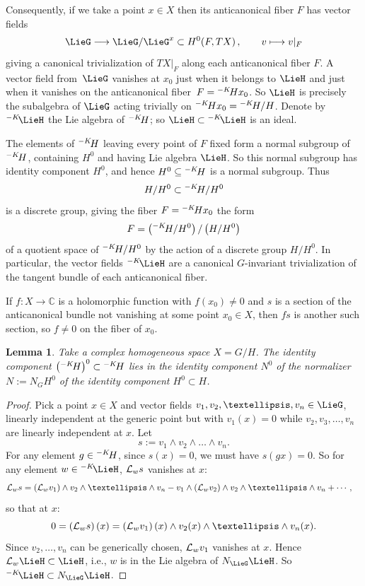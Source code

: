 \documentclass[11pt]{article}
\numberwithin{equation}{section}
\providecommand{\C}{\mathbb{C}}
\numberwithin{equation}{section}
\newtheorem{Lemma}[Theorem]{Lemma}
\renewcommand{\C}{\mathbb{C}}
\newcommand*{\acf}[1]{\Iitaka[\acb{}]{#1}}
\begin{document}
Consequently, if we take a point $x \in X$ then its anticanonical fiber $F$ has vector fields
\[
\LieG \longrightarrow \LieG/\LieG^x \subset \cohomology{0}{F, TX}, \qquad
v \longmapsto v|_F
\]
giving a canonical trivialization of $ TX|_F$ along each anticanonical fiber $F$.
A vector field from~$\LieG$ vanishes at $x_0$ just when it belongs to $\LieH$ and just when it vanishes on the anticanonical
fiber~${F = \acf{H}x_0}$.
So $\LieH$ is precisely the subalgebra of $\LieG$ acting trivially on $\acf{H}x_0 = \acf{H}/H$.
Denote by $\acf\LieH$ the Lie algebra of $\acf{H}$; so $\LieH \subset \acf\LieH$ is an ideal.

The elements of $\acf{H}$ leaving every point of $F$ fixed form a normal subgroup of $\acf{H}$, containing $H^0$ and having Lie algebra $\LieH$.
So this normal subgroup has identity component $H^0$, and hence $H^0 \subseteq \acf{H}$ is a normal subgroup.
Thus
\[
H/H^0 \subset \acf{H}/H^0
\]
is a discrete group, giving the fiber $F = \acf{H}x_0$ the form
\[
F = \pr{\acf{H}/H^0}/\pr{H/H^0}
\]
of a quotient space of $\acf{H}/H^0$ by the action of a discrete group $H/H^0$.
In particular, the vector fields $\acf\LieH$ are a canonical $G$-invariant trivialization of the tangent bundle of each anticanonical fiber.

If $f \colon X \to \C$ is a holomorphic function with $f(x_0) \ne 0$ and $s$ is a section of the anticanonical bundle not vanishing at some point $x_0 \in X$, then $fs$ is another such section, so $f\ne 0$ on the fiber of $x_0$.

\begin{Lemma}
Take a complex homogeneous space $X = G/H$.
The identity component $\big(\acf{H}\big)^0 \subset \acf{H}$ lies in the identity component $N^0$ of the
normalizer $N := N_G H^0$ of the identity component $H^0 \subset H$.
\end{Lemma}

\begin{proof}
Pick a point $x \in X$ and vector fields $v_1, v_2, \dots, v_n \in \LieG$, linearly independent at the generic point
but with $v_1(x) = 0$ while $v_2, v_3, \dots, v_n$ are linearly independent at $x$.
Let
\[
s := v_1 \wedge v_2 \wedge \dots \wedge v_n.
\]
For any element $g \in \acf{H}$, since $s(x) = 0$, we must have $s(gx) = 0$.
So for any element $w \in \acf\LieH$, $\mathcal L_w s$ vanishes at $x$:
\begin{align*}
\LieDer_w s
& =
\pr{\LieDer_w v_1} \wedge v_2 \wedge \dots \wedge v_n - v_1 \wedge \pr{\LieDer_w v_2} \wedge v_2 \wedge \dots \wedge v_n + \cdots,
\end{align*}
so that at $x$:
\[
0 = \pr{\LieDer_w s}(x) = \pr{\LieDer_w v_1}(x) \wedge v_2(x) \wedge \dots \wedge v_n(x).
\]
Since $v_2, \dots, v_n$ can be generically chosen, $\mathcal L_w v_1$ vanishes at $x$.
Hence $\LieDer_w \LieH \subset \LieH$, i.e., $w$ is in the Lie algebra of $N_{\LieG} \LieH$.
So $\acf\LieH \subset N_{\LieG} \LieH$.
\end{proof}
\end{document}
